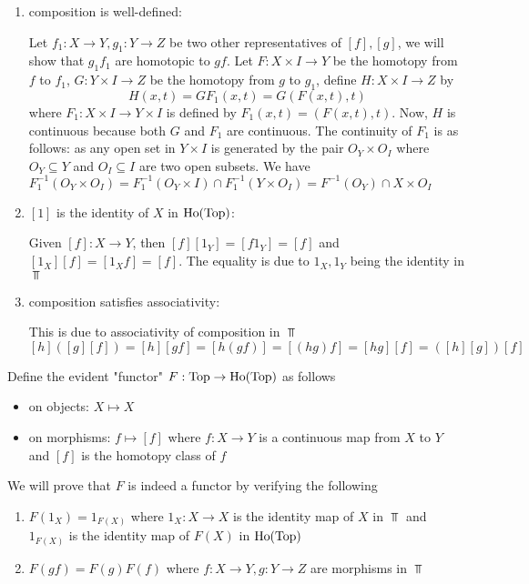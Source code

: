 \documentclass{article}
\begin{document}
\begin{longproof}
\begin{enumerate}
    \item composition is well-defined:
    
    Let $f_1: X \to Y, g_1: Y \to Z$ be two other representatives of $[f], [g]$, we will show that $g_1 f_1$ are homotopic to $gf$. Let $F: X \times I \to Y$ be the homotopy from $f$ to $f_1$, $G: Y \times I \to Z$ be the homotopy from $g$ to $g_1$, define $H: X \times I \to Z$ by
    $$
        H(x, t) = G F_1 (x, t) = G(F(x, t), t)
    $$
    where $F_1: X \times I \to Y \times I$ is defined by $F_1(x, t) = (F(x, t), t)$. Now, $H$ is continuous because both $G$ and $F_1$ are continuous. The continuity of $F_1$ is as follows: as any open set in $Y \times I$ is generated by the pair $O_Y \times O_I$ where $O_Y \subseteq Y$ and $O_I \subseteq I$ are two open subsets. We have $F_1^{-1}(O_Y \times O_I) = F_1^{-1}(O_Y \times I) \cap F_1^{-1}(Y \times O_I) = F^{-1}(O_Y) \cap X \times O_I$

    \item $[1]$ is the identity of $X$ in $\operatorname{Ho}(\operatorname{Top})$:

    Given $[f]: X \to Y$, then $[f][1_Y] = [f 1_Y] = [f]$ and $[1_X][f] = [1_X f] = [f]$. The equality is due to $1_X, 1_Y$ being the identity in $\Top$
    
    \item composition satisfies associativity:

    This is due to associativity of composition in $\Top$
    $$
        [h]([g][f]) = [h][gf] = [h(gf)] = [(hg)f] = [hg][f] = ([h][g])[f]
    $$
\end{enumerate}
\end{longproof}

Define the evident "functor" $F: \operatorname{Top} \to \operatorname{Ho}(\operatorname{Top})$ as follows
\begin{itemize}
    \item on objects: $X \mapsto X$
    \item on morphisms: $f \mapsto [f]$ where $f: X \to Y$ is a continuous map from $X$ to $Y$ and $[f]$ is the homotopy class of $f$
\end{itemize}

We will prove that $F$ is indeed a functor by verifying the following
\begin{enumerate}
    \item $F(1_X) = 1_{F(X)}$ where $1_X: X \to X$ is the identity map of $X$ in $\Top$ and $1_{F(X)}$ is the identity map of $F(X)$ in $\operatorname{Ho}(\operatorname{Top})$
    \item $F(gf) = F(g)F(f)$ where $f: X \to Y, g: Y \to Z$ are morphisms in $\Top$
\end{enumerate}
\end{document}
